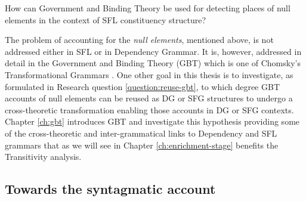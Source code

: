 \begin{question}\label{question:reuse-gbt}
    How can Government and Binding Theory be used for detecting places of null elements in the context of SFL constituency structure?
\end{question}


The problem of accounting for the \textit{null elements}, mentioned above, is not addressed either in SFL or in Dependency Grammar. It is, however, addressed in detail in the Government and Binding Theory (GBT) \citep{Chomsky81,Haegeman1991} which is one of Chomsky's Transformational Grammars \citep{Chomsky1957}. One other goal in this thesis is to investigate, as formulated in Research question \ref{question:reuse-gbt}, to which degree GBT accounts of null elements can be reused as DG or SFG structures to undergo a cross-theoretic transformation enabling those accounts in DG or SFG contexts. Chapter \ref{ch:gbt} introduces GBT and investigate this hypothesis providing some of the cross-theoretic and inter-grammatical links to Dependency and SFL grammars that as we will see in Chapter \ref{ch:enrichment-stage} benefits the Transitivity analysis.


\subsection{Towards the syntagmatic account}
\label{sec:syntagmatic-account}

